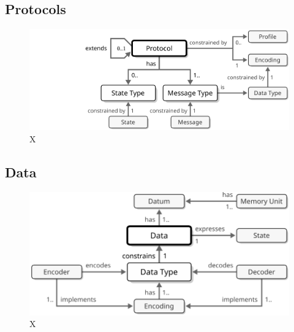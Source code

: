 \subsection{Protocols}

\begin{figure}[ht!]
  \centering
  \includegraphics{figures/protocol}
  \caption{
    X
  }
  \label{fig:protocol}
\end{figure}


\subsection{Data}

\begin{figure}[ht!]
  \centering
  \includegraphics{figures/data}
  \caption{
    X
  }
  \label{fig:data}
\end{figure}